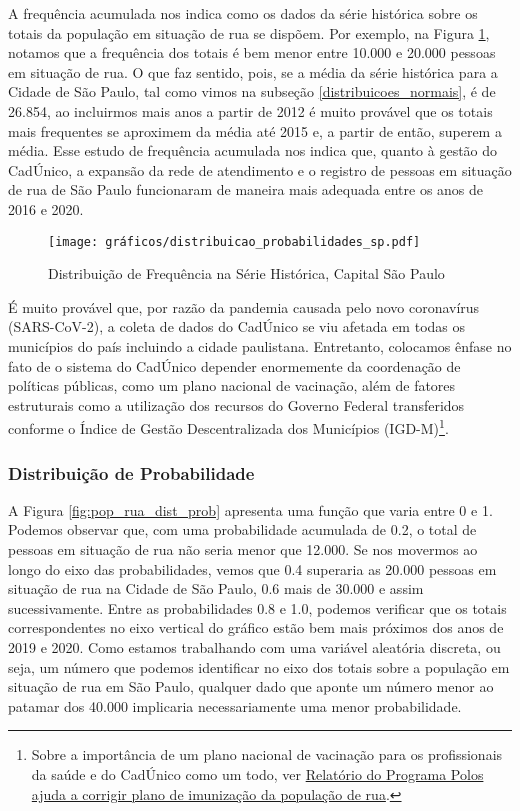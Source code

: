 \documentclass[14pt]{extarticle}
\begin{document}
A frequência acumulada nos indica como os dados da série histórica sobre os totais da população em situação de rua se dispõem. Por exemplo, na Figura \ref{fig:pop_rua_freq_acum}, notamos que a frequência dos totais é bem menor entre 10.000 e 20.000 pessoas em situação de rua. O que faz sentido, pois, se a média da série histórica para a Cidade de São Paulo, tal como vimos na subseção \ref{distribuicoes_normais}, é de 26.854, ao incluirmos mais anos a partir de 2012 é muito provável que os totais mais frequentes se aproximem da média até 2015 e, a partir de então, superem a média. Esse estudo de frequência acumulada nos indica que, quanto à gestão do CadÚnico, a expansão da rede de atendimento e o registro de pessoas em situação de rua de São Paulo funcionaram de maneira mais adequada entre os anos de 2016 e 2020. \\  

\begin{figure}[H]
\centering
	\caption{Distribuição de Frequência na Série Histórica, Capital São Paulo}
	\texttt{[image: gráficos/distribuicao\_probabilidades\_sp.pdf]}
	\label{fig:pop_rua_freq_acum}
\end{figure}


É muito provável que, por razão da pandemia causada pelo novo coronavírus (SARS-CoV-2), a coleta de dados do CadÚnico se viu afetada em todas os municípios do país incluindo a cidade paulistana. Entretanto, colocamos ênfase no fato de o sistema do CadÚnico depender enormemente da coordenação de políticas públicas, como um plano nacional de vacinação, além de fatores estruturais como a utilização dos recursos do Governo Federal transferidos conforme o Índice de Gestão Descentralizada dos Municípios (IGD-M)\footnote{Sobre a importância de um plano nacional de vacinação para os profissionais da saúde e do CadÚnico como um todo, ver \href{https://ufmg.br/comunicacao/noticias/ufmg-participa-de-correcao-do-plano-nacional-de-vacinacao-para-populacao-de-rua}{Relatório do Programa Polos ajuda a corrigir plano de imunização da população de rua}.}.    


\subsubsection{Distribuição de Probabilidade}
\label{distribuicao_probabilidade}  

A Figura \ref{fig:pop_rua_dist_prob} apresenta uma função que varia entre 0 e 1. Podemos observar que, com uma probabilidade acumulada de 0.2, o total de pessoas em situação de rua não seria menor que 12.000. Se nos movermos ao longo do eixo das probabilidades, vemos que 0.4 superaria as 20.000 pessoas em situação de rua na Cidade de São Paulo, 0.6 mais de 30.000 e assim sucessivamente. Entre as probabilidades 0.8 e 1.0, podemos verificar que os totais correspondentes no eixo vertical do gráfico estão bem mais próximos dos anos de 2019 e 2020. Como estamos trabalhando com uma variável aleatória discreta, ou seja, um número que podemos identificar no eixo dos totais sobre a população em situação de rua em São Paulo, qualquer dado que aponte um número menor ao patamar dos 40.000 implicaria necessariamente uma menor probabilidade.\\
\end{document}
